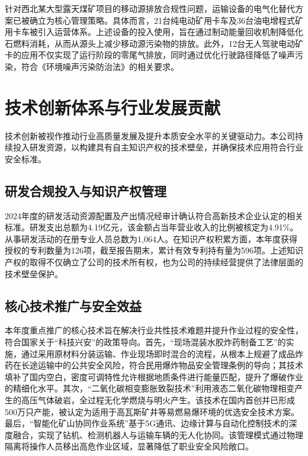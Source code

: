 \documentclass[a4paper,12pt]{article}
\begin{document}
针对西北某大型露天煤矿项目的移动源排放合规性问题，运输设备的电气化替代方案已被确立为核心管理策略。具体而言，21台纯电动矿用卡车及36台油电增程式矿用卡车被引入运营体系。上述设备的投入使用，旨在通过制动能量回收机制降低化石燃料消耗，从而从源头上减少移动源污染物的排放。此外，12台无人驾驶电动矿卡的应用不仅实现了运行阶段的零尾气排放，同时通过优化行驶路径降低了噪声污染，符合《环境噪声污染防治法》的相关要求。

\section{技术创新体系与行业发展贡献}

技术创新被视作推动行业高质量发展及提升本质安全水平的关键驱动力。本公司持续投入研发资源，以构建具有自主知识产权的技术壁垒，并确保技术应用符合行业安全标准。

\subsection{研发合规投入与知识产权管理}

2024年度的研发活动资源配置及产出情况经审计确认符合高新技术企业认定的相关标准。研发支出总额为4.19亿元，该金额占当年营业收入的比例被核定为4.91\%。从事研发活动的在册专业人员总数为1,064人。在知识产权积累方面，本年度获得授权的专利数量为126项，截至报告期末，累计有效专利持有量为596项。上述知识产权的取得不仅确立了公司的技术所有权，也为公司的持续经营提供了法律层面的技术壁垒保护。

\subsection{核心技术推广与安全效益}

本年度重点推广的核心技术旨在解决行业共性技术难题并提升作业过程的安全性，符合国家关于“科技兴安”的政策导向。首先，“现场混装水胶炸药制备工艺”的实施，通过采用原材料分装运输、作业现场即时混合的流程，从根本上规避了成品炸药在长途运输中的公共安全风险，符合民用爆炸物品安全管理条例的导向；其技术填补了国内空白，密度可调特性允许根据地质条件进行能量匹配，提升了爆破作业的精细化水平。其次，“二氧化碳相变膨胀致裂技术”利用液态二氧化碳物理相变产生的高压气体破岩，全过程无化学燃烧与明火产生。该技术在国内首创并已形成500万只产能，被认定为适用于高瓦斯矿井等易燃易爆环境的优选安全技术方案。最后，“智能化矿山协同作业系统”基于5G通讯、边缘计算与自动化控制技术的深度融合，实现了钻机、检测机器人与运输车辆的无人化协同。该管理模式通过物理隔离将操作人员移出高危作业区域，显著降低了职业安全风险敞口。
\end{document}
